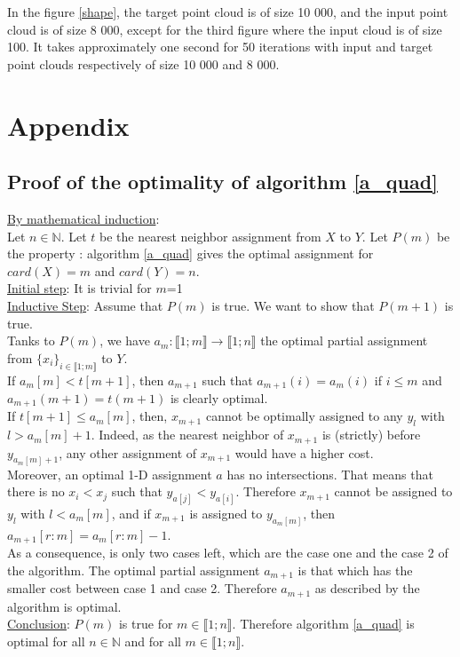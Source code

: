 \documentclass[a4paper,12pt]{article}
\begin{document}
In the figure \ref{shape}, the target point cloud is of size 10 000, and the input point cloud is of size 8 000, except for the third figure where the input cloud is of size 100. It takes approximately one second for 50 iterations with input and target point clouds respectively of size 10 000 and 8 000.

\section{Appendix}

\subsection{Proof of the optimality of algorithm \ref{a_quad}}
\label{a_quad_proof}

\noindent \underline{By mathematical induction}:\\
Let $n \in \mathbb{N}$.
Let $t$ be the nearest neighbor assignment from $X$ to $Y$.
Let $P(m)$ be the property : algorithm \ref{a_quad} gives the optimal assignment for $card(X)=m$ and $card(Y)=n$.\\
\noindent \underline{Initial step}: It is trivial for $m$=1 \\
\noindent \underline{Inductive Step}: Assume that $P(m)$ is true. We want to show that $P(m+1)$ is true. \\
\noindent Tanks to $P(m)$, we have $a_m : \llbracket 1;m \rrbracket \rightarrow \llbracket 1;n \rrbracket$ the optimal partial assignment from $\{x_i\}_{i \in \llbracket 1;m \rrbracket}$ to $Y$.\\
\noindent If $a_m[m] < t[m+1]$, then $a_{m+1}$ such that $a_{m+1}(i)=a_m(i)$ if $i \leqslant m$ and $a_{m+1}(m+1)=t(m+1)$ is clearly optimal.\\
\noindent
\noindent If $t[m+1] \leqslant a_m[m]$, then, $x_{m+1}$ cannot be optimally assigned to any $y_l$ with $l>a_m[m]+1$. Indeed, as the nearest neighbor of $x_{m+1}$ is (strictly) before $y_{a_m[m]+1}$, any other assignment of $x_{m+1}$ would have a higher cost. \\
\noindent Moreover, an optimal 1-D assignment $a$ has no intersections. That means that there is no $x_i < x_j$ such that $y_{a[j]} < y_{a[i]}$. Therefore $x_{m+1}$  cannot be assigned to $y_l$ with $l<a_m[m]$, and if $x_{m+1}$ is assigned to $y_{a_m[m]}$, then $a_{m+1}[r:m] = a_{m}[r:m]-1$.\\
\noindent As a consequence, is only two cases left, which are the case one and the case 2 of the algorithm. The optimal partial assignment $a_{m+1}$ is that which has the smaller cost between case 1 and case 2.
\noindent Therefore $a_{m+1}$ as described by the algorithm is optimal.\\
\noindent \underline{Conclusion}: $P(m)$ is true for $m \in \llbracket 1;n \rrbracket$. Therefore algorithm \ref{a_quad} is optimal for all $n \in \mathbb{N}$ and for all $m \in \llbracket 1;n \rrbracket$.
\end{document}
